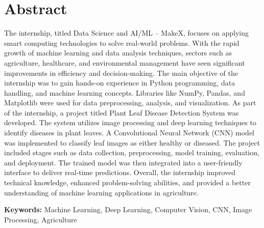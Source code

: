 \documentclass[12pt,a4paper,oneside]{memoir}
\begin{document}

\chapter*{Abstract}

The internship, titled Data Science and AI/ML – MakeX, focuses on applying smart computing technologies to solve real-world problems. With the rapid growth of machine learning and data analysis techniques, sectors such as agriculture, healthcare, and environmental management have seen significant improvements in efficiency and decision-making. The main objective of the internship was to gain hands-on experience in Python programming, data handling, and machine learning concepts. Libraries like NumPy, Pandas, and Matplotlib were used for data preprocessing, analysis, and visualization. As part of the internship, a project titled Plant Leaf Disease Detection System was developed. The system utilizes image processing and deep learning techniques to identify diseases in plant leaves. A Convolutional Neural Network (CNN) model was implemented to classify leaf images as either healthy or diseased. The project included stages such as data collection, preprocessing, model training, evaluation, and deployment. The trained model was then integrated into a user-friendly interface to deliver real-time predictions. Overall, the internship improved technical knowledge, enhanced problem-solving abilities, and provided a better understanding of machine learning applications in agriculture.

\vspace{1em}
\noindent\textbf{Keywords:} Machine Learning, Deep Learning, Computer Vision, CNN, Image Processing, Agriculture

\newpage

\pagestyle{plain}
\frontmatter
{}
\renewcommand{\contentsname}{Table of Contents}
\tableofcontents
\newpage
\listoffigures
\newpage
\listoftables 
\newpage
\mainmatter 
{}
\pagestyle{myheadings}
\end{document}
